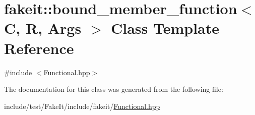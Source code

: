 \hypertarget{classfakeit_1_1bound__member__function}{}\section{fakeit\+::bound\+\_\+member\+\_\+function$<$ C, R, Args $>$ Class Template Reference}
\label{classfakeit_1_1bound__member__function}


{\ttfamily \#include $<$Functional.\+hpp$>$}



The documentation for this class was generated from the following file\+:\begin{DoxyCompactItemize}
\item 
include/test/\+Fake\+It/include/fakeit/\mbox{\hyperlink{Functional_8hpp}{Functional.\+hpp}}\end{DoxyCompactItemize}
